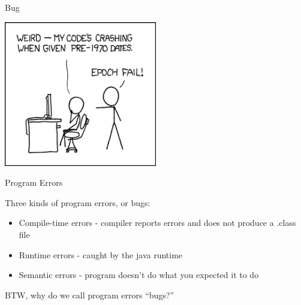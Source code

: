 \documentclass{beamer}
\author[Chris Simpkins]
{Christopher Simpkins \\\texttt{chris.simpkins@gatech.edu}}
\institute[Georgia Tech] %
\date{}
\begin{document}
\begin{frame}
  \titlepage
\end{frame}


\begin{frame}[fragile]{Bug}

\begin{center}
\includegraphics[height=2.5in]{bug.png}\\
\end{center}

\end{frame}



\begin{frame}[fragile]{Program Errors}


Three kinds of program errors, or bugs:
\begin{itemize}
\item Compile-time errors - compiler reports errors and does not produce a .class file
\item Runtime errors - caught by the java runtime
\item Semantic errors - program doesn't do what you expected it to do
\end{itemize}
\vspace{.2in}
BTW, why do we call program errors ``bugs?''

\end{frame}
\end{document}
